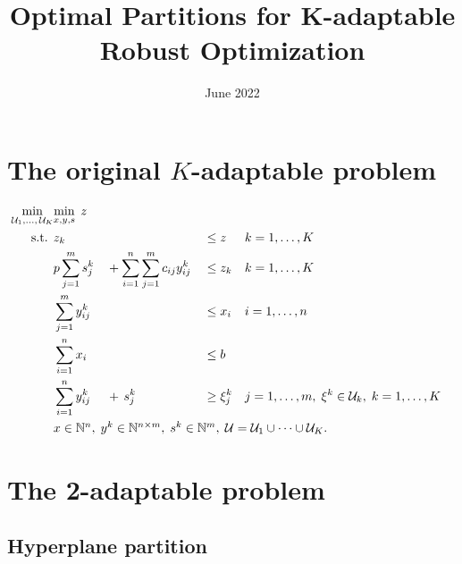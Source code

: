 \documentclass{article}
\title{Optimal Partitions for K-adaptable Robust Optimization}
\date{June 2022}
\newcommand{\uncset}{\mathcal{U}}
\newcommand{\uncparam}{\xi}
\newcommand{\snno}{n}
\newcommand{\sn}{i}
\newcommand{\dnno}{m}
\newcommand{\dn}{j}
\begin{document}
\maketitle

\section{The original $K$-adaptable problem}

\begin{align}
\arraycolsep=1.3pt\def\arraystretch{1.3}
 \displaystyle \min_{\uncset_1,\dots,\,\uncset_K}& \omit\rlap{$\displaystyle\min_{x,y,s}\; z$}  \\
\textrm{s.t. } 	& z_k && &&\leq z && k=1,\dots,K \\
                & p\sum\limits_{\dn=1}^\dnno s_\dn^k &&+ \sum\limits_{\sn=1}^\snno\sum\limits_{\dn=1}^\dnno c_{\sn\dn}y_{\sn\dn}^k && \leq z_k &&k=1,\dots,K\\
				& \sum\limits_{\dn=1}^\dnno y_{\sn\dn}^k && 	&& \leq x_\sn 	&&\sn=1,\dots,\snno \\
                & \sum\limits_{\sn=1}^\snno x_\sn &&	&& \leq b \\
                & \sum\limits_{\sn=1}^\snno y_{\sn\dn}^k &&+\, s_\dn^k &&\geq  \uncparam_\dn^k && \dn=1,\dots,\dnno,\; \uncparam^k\in \uncset_k,\; k=1,\dots,K \\
                & \omit\rlap{$x\in \mathbb{N}^n,\; y^k\in \mathbb{N}^{\snno\times \dnno},\;s^k\in\mathbb{N}^\dnno,\;\uncset=\uncset_1\cup\dots\cup\uncset_K.$}
\end{align}

\section{The 2-adaptable problem}

\subsection{Hyperplane partition}
\end{document}
